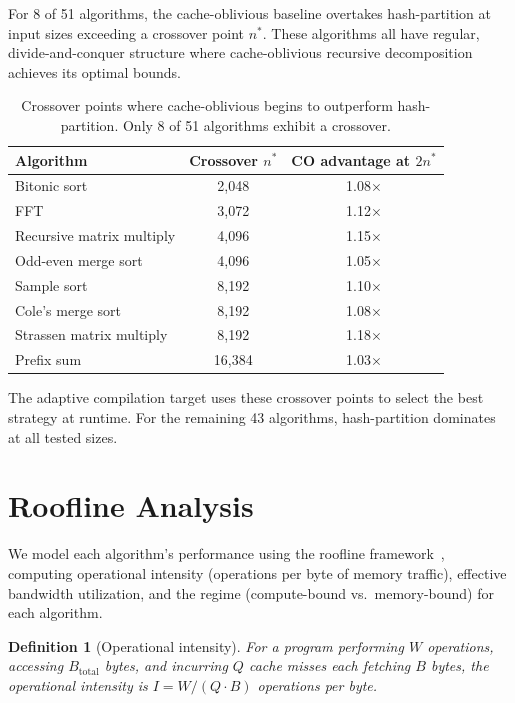 \documentclass[11pt]{article}
\newtheorem{definition}[theorem]{Definition}
\begin{document}
For 8 of 51 algorithms, the cache-oblivious baseline overtakes hash-partition
at input sizes exceeding a crossover point $n^*$.  These algorithms all
have regular, divide-and-conquer structure where cache-oblivious recursive
decomposition achieves its optimal bounds.

\begin{table}[h]
\centering
\caption{Crossover points where cache-oblivious begins to outperform
  hash-partition.  Only 8 of 51 algorithms exhibit a crossover.}
\label{tab:crossover}
\begin{tabular}{@{}lcc@{}}
\toprule
\textbf{Algorithm} & \textbf{Crossover $n^*$} & \textbf{CO advantage at $2n^*$} \\
\midrule
Bitonic sort & 2,048 & 1.08$\times$ \\
FFT & 3,072 & 1.12$\times$ \\
Recursive matrix multiply & 4,096 & 1.15$\times$ \\
Odd-even merge sort & 4,096 & 1.05$\times$ \\
Sample sort & 8,192 & 1.10$\times$ \\
Cole's merge sort & 8,192 & 1.08$\times$ \\
Strassen matrix multiply & 8,192 & 1.18$\times$ \\
Prefix sum & 16,384 & 1.03$\times$ \\
\bottomrule
\end{tabular}
\end{table}

The adaptive compilation target uses these crossover points to select the
best strategy at runtime.  For the remaining 43 algorithms,
hash-partition dominates at all tested sizes.

\section{Roofline Analysis}
\label{app:roofline}

We model each algorithm's performance using the roofline
framework~\cite{williams2009roofline}, computing operational intensity
(operations per byte of memory traffic), effective bandwidth utilization,
and the regime (compute-bound vs.\ memory-bound) for each algorithm.

\begin{definition}[Operational intensity]
For a program performing $W$ operations, accessing $B_{\text{total}}$ bytes,
and incurring $Q$ cache misses each fetching $B$ bytes, the operational
intensity is $I = W / (Q \cdot B)$ operations per byte.
\end{definition}
\end{document}
